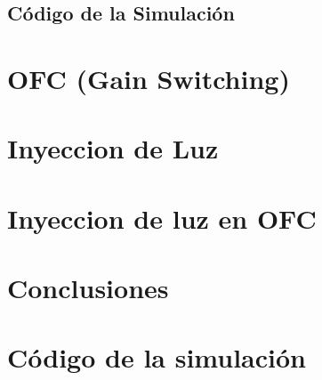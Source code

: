 \documentclass[a4paper, 11pt, oneside]{book}
\begin{document}
				\section{Código de la Simulación}
				
				
			\chapter{OFC (Gain Switching)}

					

			\chapter{Inyeccion de Luz}

				

				
			\chapter{Inyeccion de luz en OFC}

%
%
			\chapter{Conclusiones}


			
			

				
			\newpage

				\appendix

					\chapter{Código de la simulación}

						

	
\end{document}
